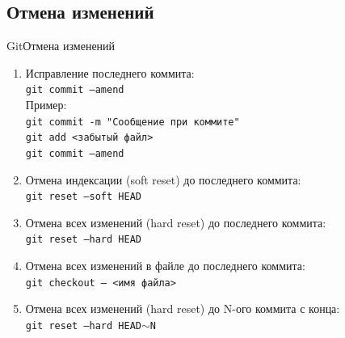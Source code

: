 \documentclass[10pt]{beamer}
\begin{document}
\subsection{Отмена изменений}
\begin{frame}[fragile]{Git}{Отмена изменений}
\begin{enumerate}
\item Исправление последнего коммита:\\
\texttt{git commit ---amend}\\
Пример:\\
\texttt{git commit -m "Сообщение при коммите"}\\
\texttt{git add <забытый файл>}\\
\texttt{git commit ---amend}\\

\item Отмена индексации (soft reset) до последнего коммита:\\
\texttt{git reset ---soft HEAD}\\

\item Отмена всех изменений (hard reset) до последнего коммита:\\
\texttt{git reset ---hard HEAD}\\

\item Отмена всех изменений в файле до последнего коммита:\\
\texttt{git checkout --- <имя файла> }\\

\item Отмена всех изменений (hard reset) до N-ого коммита с конца:\\
\texttt{git reset ---hard HEAD$\sim$N}\\
\end{enumerate}
\end{frame}
\end{document}
